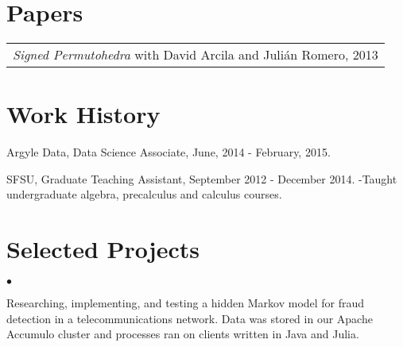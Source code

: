 \documentclass[margin,line,pifont,palatino,courier]{res}
\newenvironment{list1}{
  \begin{list}{\label{}}{%
      \setlength{\itemsep}{0in}
      \setlength{\parsep}{0in} \setlength{\parskip}{0in}
      \setlength{\topsep}{0in} \setlength{\partopsep}{0in}
      \setlength{\leftmargin}{0.0in}}}{\end{list}}
\newenvironment{list2}{
  \begin{list}{$\bullet$}{%
      \setlength{\itemsep}{0in}
      \setlength{\parsep}{0in} \setlength{\parskip}{0in}
      \setlength{\topsep}{0in} \setlength{\partopsep}{0in}
      \setlength{\leftmargin}{0.2in}}}{\end{list}}
\begin{document}
\begin{resume}







\section{\sc Papers}
\begin{tabular}{@{}p{5in}}
    {\em Signed Permutohedra} with David Arcila and Juli\'an Romero, 2013
\end{tabular}









\section{\sc  Work History}

\begin{list1}
 \item Argyle Data, Data Science Associate, June, 2014 - February, 2015.
 \item SFSU, Graduate Teaching Assistant, September 2012 - December 2014.
      -Taught undergraduate algebra, precalculus and calculus courses. 
\end{list1}



\section{\sc  Selected Projects}

\begin{list2}
  \item Researching, implementing, and testing a hidden Markov model for fraud detection in a telecommunications network. Data was stored in our Apache Accumulo cluster and processes ran on clients written in Java and Julia.  


\end{list2}
\end{resume}
\end{document}
